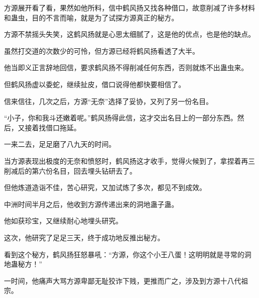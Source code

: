 \begin{this_body}
方源展开看了看，果然如他所料，信中鹤风扬又找各种借口，故意削减了许多材料和蛊虫，目的不言而喻，就是为了试探方源真正的秘方。

方源不禁摇头失笑，这鹤风扬就是心思太细腻了，这是他的优点，也是他的缺点。

虽然打交道的次数少的可怜，但方源已经将鹤风扬看透了大半。

他当即义正言辞地回信，要求鹤风扬不得削减任何东西，否则就炼不出蛊虫来。

但鹤风扬虚以委蛇，继续扯皮，借口说得他都快要相信了。

信来信往，几次之后，方源“无奈”选择了妥协，又列了另一份名目。

“小子，你和我斗还嫩着呢。”鹤风扬得此信，这才交出名目上的一部分东西。然后，又接着找借口拖延。

一来二去，足足磨了八九天的时间。

当方源表现出极度的无奈和愤怒时，鹤风扬这才收手，觉得火候到了，拿捏着再三削减后的第六份名目，回去埋头钻研去了。

但他炼道造诣不佳，苦心研究，又加试炼了多次，都见不到成效。

中洲时间半月之后，他收到方源传递出来的洞地蛊子蛊。

他如获珍宝，又继续耐心地埋头研究。

这次，他研究了足足三天，终于成功地反推出秘方。

看到这个秘方，鹤风扬狂怒暴吼：“方源，你这个小王八蛋！这明明就是寻常的洞地蛊秘方！”

一时间，他痛声大骂方源卑鄙无耻狡诈下贱，更推而广之，涉及到方源十八代祖宗。

\end{this_body}


